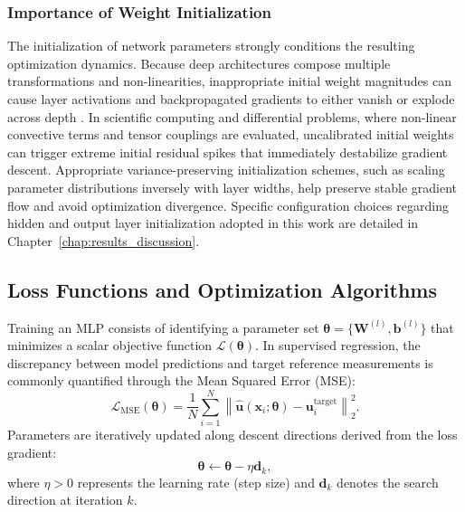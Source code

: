 \subsubsection{Importance of Weight Initialization}
\label{subsubsec:weight_initialization}

The initialization of network parameters strongly conditions the resulting optimization dynamics.
Because deep architectures compose multiple transformations and non-linearities, inappropriate initial weight magnitudes can cause layer activations and backpropagated gradients to either vanish or explode across depth \cite{goodfellow2016deep}.
In scientific computing and differential problems, where non-linear convective terms and tensor couplings are evaluated, uncalibrated initial weights can trigger extreme initial residual spikes that immediately destabilize gradient descent.
Appropriate variance-preserving initialization schemes, such as scaling parameter distributions inversely with layer widths, help preserve stable gradient flow and avoid optimization divergence.
Specific configuration choices regarding hidden and output layer initialization adopted in this work are detailed in Chapter~\ref{chap:results_discussion}.

\subsection{Loss Functions and Optimization Algorithms}
\label{subsec:optimization_solvers}

Training an MLP consists of identifying a parameter set $\boldsymbol{\theta} = \{ \boldsymbol{W}^{(l)}, \boldsymbol{b}^{(l)} \}$ that minimizes a scalar objective function $\mathcal{L}(\boldsymbol{\theta})$.
In supervised regression, the discrepancy between model predictions and target reference measurements is commonly quantified through the Mean Squared Error (MSE):
\begin{equation}
    \mathcal{L}_{\mathrm{MSE}}(\boldsymbol{\theta}) = \frac{1}{N} \sum_{i=1}^N \left\| \hat{\boldsymbol{u}}(\boldsymbol{x}_i; \boldsymbol{\theta}) - \boldsymbol{u}_i^{\mathrm{target}} \right\|_2^2 .
    \label{eq:mse_loss}
\end{equation}
Parameters are iteratively updated along descent directions derived from the loss gradient:
\begin{equation}
    \boldsymbol{\theta} \leftarrow \boldsymbol{\theta} - \eta \boldsymbol{d}_k ,
    \label{eq:gradient_descent_update}
\end{equation}
where $\eta > 0$ represents the learning rate (step size) and $\boldsymbol{d}_k$ denotes the search direction at iteration $k$.

